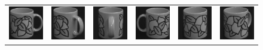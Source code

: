 \begin{figure}[p]
\begin{tabular}{cccccc}
\includegraphics[width=2cm]{coil/beeld-48.eps} &
\includegraphics[width=2cm]{coil/beeld-49.eps} &
\includegraphics[width=2cm]{coil/beeld-50.eps} &
\includegraphics[width=2cm]{coil/beeld-51.eps} &
\includegraphics[width=2cm]{coil/beeld-52.eps} &
\includegraphics[width=2cm]{coil/beeld-53.eps} \\


\end{tabular}
\end{figure}
